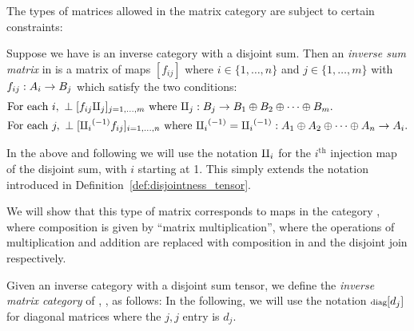 The types of matrices allowed in the matrix category are subject to certain constraints:
\begin{definition}\label{def:inverse_sum_matrix}
  Suppose we have \X is an inverse category with a disjoint sum. Then an \emph{inverse sum matrix}
  in \X is a matrix of maps $[f_{i j}]$ where $i \in \{1,\ldots, n\}$ and $j \in \{1,\ldots, m\}$ with
  $f_{ij}:A_i \to B_j$ which satisfy the two conditions:
  \begin{align}
    &\text{For each }i,\ \perp[f_{i j} \amalg_{j}]_{j=1,\ldots,m}
    \text{ where } \amalg_{j}: B_j \to B_1\oplus B_2\oplus\cdots\oplus B_m.
      \label{eq:inverse_sum_matrix_row_perp}\\
    &\text{For each }j,\ \perp[{\amalg_{i}}^{(-1)} f_{i j}]_{i=1,\ldots,n}
    \text{ where } {\amalg_{i}}^{(-1)} = {\amalg_{i}}^{(-1)} : A_1\oplus A_2\oplus\cdots\oplus A_n \to A_i.
    \label{eq:inverse_sum_matrix_column_perp}
  \end{align}
\end{definition}

  In the above and following we will use the notation $\amalg_{i}$ for the $i^{\text{th}}$ injection
  map of the disjoint sum, with $i$ starting at 1. This simply extends the notation introduced in
  Definition~\ref{def:disjointness_tensor}.

  We will show that this type of matrix corresponds to maps in the category \imatx, where
  composition is given by ``matrix multiplication'', where the operations of multiplication and
  addition are replaced with composition in \X and the disjoint join respectively.

\begin{definition}\label{def:inverse_matrix_category}
  Given an inverse category \X with a disjoint sum tensor, we define the \emph{inverse
  matrix category} of \X, \imatx, as follows:
  In the following, we will use the notation $\operatorname{\scriptstyle{diag}}[d_j]$ for diagonal matrices where the
  $j,j$ entry is $d_j$.
\end{definition}

